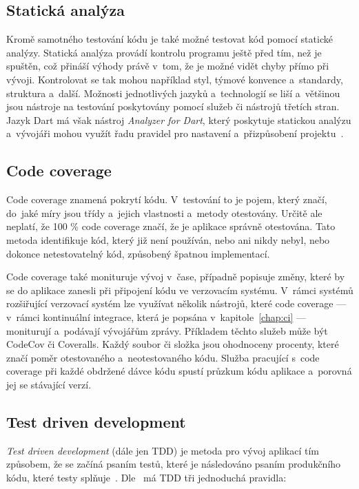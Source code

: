 \subsection{Statická analýza}

Kromě samotného testování kódu je také možné testovat kód pomocí statické
analýzy.
Statická analýza provádí kontrolu programu ještě před tím,
než je spuštěn,
což přináší výhody právě v~tom,
že je možné vidět chyby přímo při vývoji.
Kontrolovat se tak mohou například styl, týmové konvence a~standardy, struktura
a~další.
Možnosti jednotlivých jazyků a~technologií se liší a~většinou jsou nástroje
na testování poskytovány pomocí služeb či nástrojů třetích stran.
Jazyk Dart má však nástroj \emph{Analyzer for Dart},
který poskytuje statickou analýzu
a~vývojáři mohou využít řadu pravidel pro nastavení
a~přizpůsobení projektu~\cite{analyzer}.

\subsection{Code coverage}

Code coverage znamená pokrytí kódu.
V~testování to je pojem,
který značí,
do~jaké míry jsou třídy a~jejich vlastnosti a~metody otestovány.
Určitě ale neplatí,
že 100 \% code coverage značí,
že je aplikace správně otestována.
Tato metoda identifikuje kód,
který již není používán,
nebo ani nikdy nebyl,
nebo dokonce netestovatelný kód,
způsobený špatnou implementací.~\cite{code_coverage}

Code coverage také monituruje vývoj v~čase,
případně popisuje změny,
které by se do aplikace zanesli při připojení kódu ve verzovacím systému.
V~rámci systémů rozšiřující verzovací systém lze využívat několik nástrojů,
které code coverage
--- v~rámci kontinuální integrace, která je popsána v~kapitole~\ref{chap:ci} ---
moniturují a~podávají vývojářům zprávy.
Příkladem těchto služeb může být CodeCov či Coveralls.
Každý soubor či složka jsou ohodnoceny procenty,
které značí poměr otestovaného a~neotestovaného kódu.
Služba pracující s~code coverage při každé obdržené dávce kódu spustí
průzkum kódu aplikace a~porovná jej se stávající verzí.~\cite{code_coverage}

\subsection{Test driven development}
\label{sec:tdd}

\emph{Test driven development} (dále jen TDD) je metoda pro vývoj aplikací tím
způsobem,
že se začíná psaním testů,
které je následováno psaním produkčního kódu,
které testy splňuje~\cite{tdd}.
Dle~\cite{tdd} má TDD tři jednoduchá pravidla:

